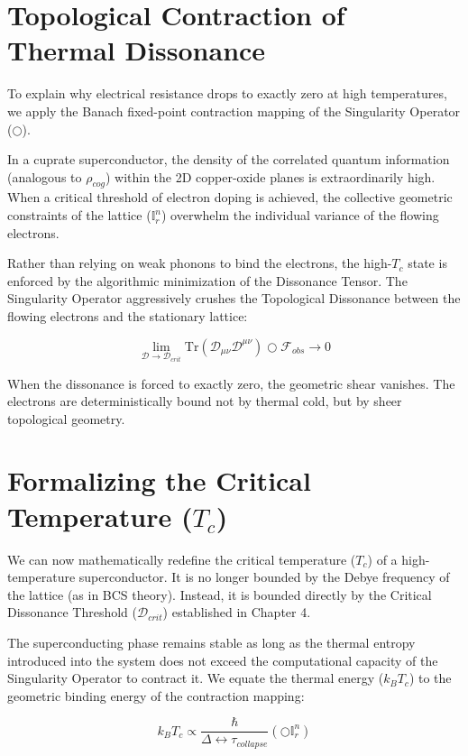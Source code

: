 \documentclass[12pt,openany]{book}
\begin{document}
\section{Topological Contraction of Thermal Dissonance}
To explain why electrical resistance drops to exactly zero at high temperatures, we apply the Banach fixed-point contraction mapping of the Singularity Operator ($\bigcirc$).

In a cuprate superconductor, the density of the correlated quantum information (analogous to $\rho_{cog}$) within the 2D copper-oxide planes is extraordinarily high. When a critical threshold of electron doping is achieved, the collective geometric constraints of the lattice ($\mathbb{I}_r^n$) overwhelm the individual variance of the flowing electrons. 

Rather than relying on weak phonons to bind the electrons, the high-$T_c$ state is enforced by the algorithmic minimization of the Dissonance Tensor. The Singularity Operator aggressively crushes the Topological Dissonance between the flowing electrons and the stationary lattice:

\begin{equation}
\lim_{\mathcal{D} \to \mathcal{D}_{crit}} \text{Tr}(\mathcal{D}_{\mu\nu} \mathcal{D}^{\mu\nu}) \bigcirc \mathcal{F}_{obs} \to 0
\end{equation}

When the dissonance is forced to exactly zero, the geometric shear vanishes. The electrons are deterministically bound not by thermal cold, but by sheer topological geometry. 

\section{Formalizing the Critical Temperature ($T_c$)}
We can now mathematically redefine the critical temperature ($T_c$) of a high-temperature superconductor. It is no longer bounded by the Debye frequency of the lattice (as in BCS theory). Instead, it is bounded directly by the Critical Dissonance Threshold ($\mathcal{D}_{crit}$) established in Chapter 4.

The superconducting phase remains stable as long as the thermal entropy introduced into the system does not exceed the computational capacity of the Singularity Operator to contract it. We equate the thermal energy ($k_B T_c$) to the geometric binding energy of the contraction mapping:

\begin{equation}
k_B T_c \propto \frac{\hbar}{\Delta \leftrightarrow\tau_{collapse}} \left( \bigcirc \mathbb{I}_r^n \right)
\end{equation}
\end{document}

